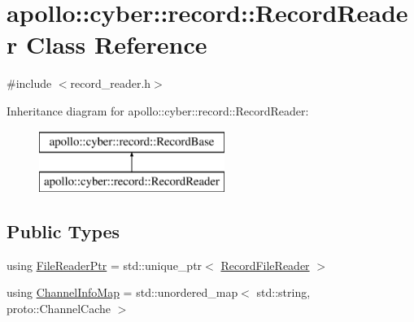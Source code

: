 \hypertarget{classapollo_1_1cyber_1_1record_1_1RecordReader}{\section{apollo\-:\-:cyber\-:\-:record\-:\-:Record\-Reader Class Reference}
\label{classapollo_1_1cyber_1_1record_1_1RecordReader}
}


{\ttfamily \#include $<$record\-\_\-reader.\-h$>$}

Inheritance diagram for apollo\-:\-:cyber\-:\-:record\-:\-:Record\-Reader\-:\begin{figure}[H]
\begin{center}
\leavevmode
\includegraphics[height=2.000000cm]{classapollo_1_1cyber_1_1record_1_1RecordReader}
\end{center}
\end{figure}
\subsection*{Public Types}
\begin{DoxyCompactItemize}
\item 
using \hyperlink{classapollo_1_1cyber_1_1record_1_1RecordReader_a99d60a127dc557823804ea7a38f2b337}{File\-Reader\-Ptr} = std\-::unique\-\_\-ptr$<$ \hyperlink{classapollo_1_1cyber_1_1record_1_1RecordFileReader}{Record\-File\-Reader} $>$
\item 
using \hyperlink{classapollo_1_1cyber_1_1record_1_1RecordReader_a3eb18b9cfa2630f3e4680e89d4ac50be}{Channel\-Info\-Map} = std\-::unordered\-\_\-map$<$ std\-::string, proto\-::\-Channel\-Cache $>$
\end{DoxyCompactItemize}
